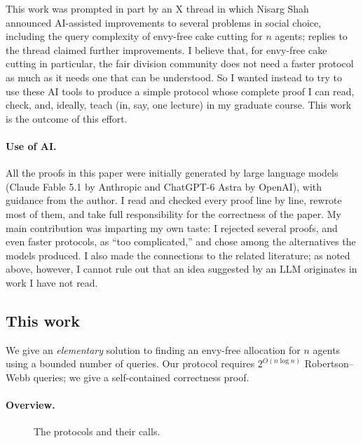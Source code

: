 \documentclass[11pt]{article}
\newcommand{\Core}{\textsc{Core}}
\newcommand{\Repair}{\textsc{Repair}}
\newcommand{\Dominate}{\textsc{Dominate}}
\newcommand{\Divide}{\textsc{Divide}}
\newcommand{\Permute}{\textsc{Permute}}
\theoremstyle{plain}
\theoremstyle{definition}
\theoremstyle{plain}
\begin{document}
This work was prompted in part by an X thread in which Nisarg Shah~\cite{shah2026tweet} announced AI-assisted improvements to several problems in social choice, including the query complexity of envy-free cake cutting for $n$ agents; replies to the thread claimed further improvements. I believe that, for envy-free cake cutting in particular, the fair division community does not need a faster protocol as much as it needs one that can be understood. So I wanted instead to try to use these AI tools to produce a simple protocol whose complete proof I can read, check, and, ideally, teach (in, say, one lecture) in my graduate course. This work is the outcome of this effort.

\paragraph{Use of AI.} All the proofs in this paper were initially generated by large language models (Claude Fable 5.1 by Anthropic and ChatGPT-6 Astra by OpenAI), with guidance from the author. I read and checked every proof line by line, rewrote most of them, and take full responsibility for the correctness of the paper. My main contribution was imparting my own taste: I rejected several proofs, and even faster protocols, as ``too complicated,'' and chose among the alternatives the models produced. I also made the connections to the related literature; as noted above, however, I cannot rule out that an idea suggested by an LLM originates in work I have not read.


\subsection{This work}

We give an \emph{elementary} solution to finding an envy-free allocation for $n$ agents using a bounded number of queries. Our protocol requires $2^{O(n \log n)}$ Robertson--Webb queries; we give a self-contained correctness proof. 

\paragraph{Overview.}

\begin{figure}[th]
\centering
{}
\caption{The protocols and their calls.}
\label{fig:calls}
\end{figure}
\end{document}
